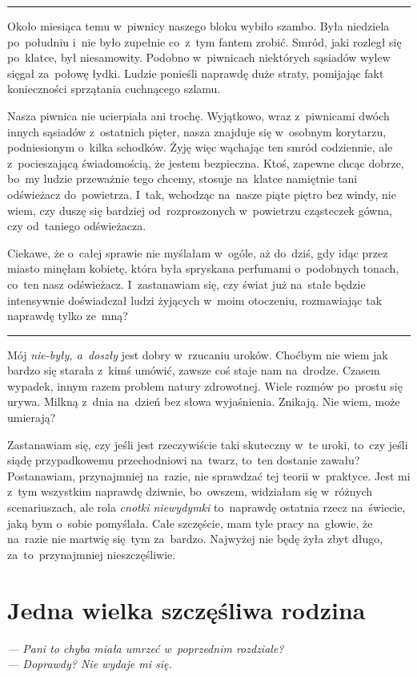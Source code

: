 \documentclass[9pt, a5paper]{memoir}
\begin{document}
\fancybreak{* \quad * \quad *}

Około miesiąca temu w~piwnicy naszego bloku wybiło szambo. Była niedziela po~południu i~nie było zupełnie co~z~tym fantem zrobić. Smród, jaki rozległ się po~klatce, był niesamowity. Podobno w~piwnicach niektórych sąsiadów wylew sięgał za~połowę łydki. Ludzie ponieśli naprawdę duże straty, pomijając fakt konieczności sprzątania cuchnącego szlamu.

Nasza piwnica nie ucierpiała ani trochę. Wyjątkowo, wraz z~piwnicami dwóch innych sąsiadów z~ostatnich pięter, nasza znajduje się w~osobnym korytarzu, podniesionym o~kilka schodków. Żyję więc wąchając ten smród codziennie, ale z~pocieszającą świadomością, że jestem bezpieczna. Ktoś, zapewne chcąc dobrze, bo~my ludzie przeważnie tego chcemy, stosuje na~klatce namiętnie tani odświeżacz do~powietrza. I~tak, wchodząc na~nasze piąte piętro bez windy, nie wiem, czy duszę się bardziej od~rozproszonych w~powietrzu cząsteczek gówna, czy od~taniego odświeżacza.

Ciekawe, że o~całej sprawie nie myślałam w~ogóle, aż do~dziś, gdy idąc przez miasto minęłam kobietę, która była spryskana perfumami o~podobnych tonach, co~ten nasz odświeżacz. I~zastanawiam się, czy świat już na~stałe będzie intensywnie doświadczał ludzi żyjących w~moim otoczeniu, rozmawiając tak naprawdę tylko ze~mną?

\fancybreak{* \quad * \quad *}

Mój \textit{nie-były, a~doszły} jest dobry w~rzucaniu uroków. Choćbym nie wiem jak bardzo się starała z~kimś umówić, zawsze coś staje nam na~drodze. Czasem wypadek, innym razem problem natury zdrowotnej. Wiele rozmów po~prostu się urywa. Milkną z~dnia na~dzień bez słowa wyjaśnienia. Znikają. Nie wiem, może umierają?

Zastanawiam się, czy jeśli jest rzeczywiście taki skuteczny w~te uroki, to~czy jeśli siądę przypadkowemu przechodniowi na~twarz, to~ten dostanie zawału? Postanawiam, przynajmniej na~razie, nie sprawdzać tej teorii w~praktyce. Jest mi z~tym wszystkim naprawdę dziwnie, bo~owszem, widziałam się w~różnych scenariuszach, ale rola \textit{cnotki niewydymki} to~naprawdę ostatnia rzecz na~świecie, jaką bym o~sobie pomyślała. Całe szczęście, mam tyle pracy na~głowie, że na~razie nie martwię się~tym za~bardzo. Najwyżej nie będę żyła zbyt długo, za~to~przynajmniej nieszczęśliwie.

\newpage
\section{Jedna wielka szczęśliwa rodzina}
{
\itshape
--- Pani to chyba miała umrzeć w~poprzednim rozdziale?\\
--- Doprawdy? Nie wydaje mi się.
}
\end{document}
